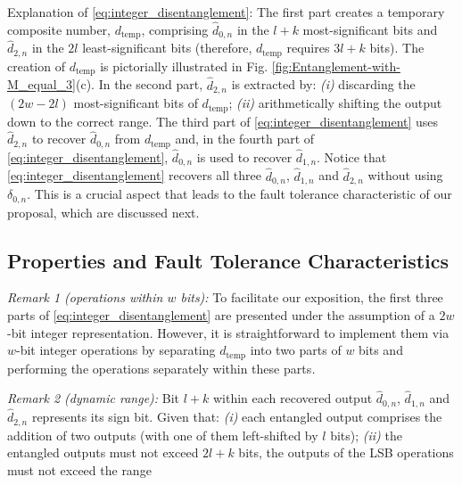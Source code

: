 \documentclass[twocolumn,english,onecolumn]{IEEEtran}
\theoremstyle{plain}
\theoremstyle{plain}
\begin{document}
Explanation of \eqref{eq:integer_disentanglement}: The first part
creates a temporary composite number, $d_{\text{temp}}$, comprising
$\hat{d}_{0,n}$ in the $l+k$ most-significant bits and $\hat{d}_{2,n}$
in the $2l$ least-significant bits (therefore, $d_{\textrm{temp}}$
requires $3l+k$ bits). The creation of $d_{\text{temp}}$ is pictorially
illustrated in Fig. \ref{fig:Entanglement-with-M_equal_3}(c). In
the second part, $\hat{d}_{2,n}$ is extracted by: \emph{(i)} discarding
the $\left(2w-2l\right)$ most-significant bits of $d_{\text{temp}}$;
\emph{(ii)} arithmetically shifting the output down to the correct
range. The third part of \eqref{eq:integer_disentanglement} uses
$\hat{d}_{2,n}$ to recover $\hat{d}_{0,n}$ from $d_{\text{temp}}$
and, in the fourth part of \eqref{eq:integer_disentanglement}, $\hat{d}_{0,n}$
is used to recover $\hat{d}_{1,n}$. Notice that \eqref{eq:integer_disentanglement}
recovers all three $\hat{d}_{0,n}$, $\hat{d}_{1,n}$ and $\hat{d}_{2,n}$
without using $\delta_{0,n}$. This is a crucial aspect that leads
to the fault tolerance characteristic of our proposal, which are discussed
next. 


\subsection{Properties and Fault Tolerance Characteristics}

\emph{Remark 1 (operations within $w$ bits):} To facilitate our exposition,
the first three parts of \eqref{eq:integer_disentanglement} are presented
under the assumption of a $2w$-bit integer representation. However,
it is straightforward to implement them via $w$-bit integer operations
by separating $d_{\text{temp}}$ into two parts of $w$ bits and performing
the operations separately within these parts\emph{.}

\emph{Remark 2 (dynamic range):} Bit $l+k$ within each recovered
output $\hat{d}_{0,n}$, $\hat{d}_{1,n}$ and $\hat{d}_{2,n}$ represents
its sign bit. Given that: \emph{(i)} each entangled output comprises
the addition of two outputs (with one of them left-shifted by $l$
bits); \emph{(ii)} the entangled outputs must not exceed $2l+k$ bits,
the outputs of the LSB operations must not exceed the range 
\end{document}
